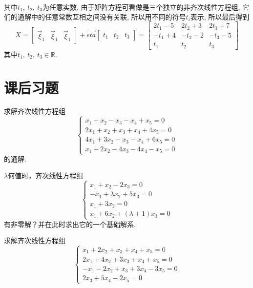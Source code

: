 \begin{eg}
其中$t_1,\ t_2,\ t_3$为任意实数, 由于矩阵方程可看做是三个独立的非齐次线性方程组, 它们的通解中的任意常数互相之间没有关联, 所以用不同的符号$t_i$表示, 所以最后得到
\begin{displaymath}
X=\begin{bmatrix}\vec{\xi}_1&\vec{\xi}_1&\vec{\xi}_1\end{bmatrix}+\vec{eta}\begin{bmatrix}
t_1&t_2&t_3\end{bmatrix}=\begin{bmatrix}2t_1-5&2t_2+3&2t_3+7\\-t_1+4&-t_2-2&-t_3-5\\t_1&t_2&t_3\end{bmatrix}
\end{displaymath}
其中$t_1,\ t_2,\ t_3\in\mathbb{R}$.
\end{eg}


\section{课后习题}

\begin{ex}\label{5.1}
求解齐次线性方程组\\
\begin{equation*}
\begin{cases}
x_1+x_2-x_3-x_4+x_5=0\\
2x_1+x_2+x_3+x_4+4x_5=0\\
4x_1+3x_2-x_3-x_4+6x_5=0\\
x_1+2x_2-4x_3-4x_4-x_5=0
\end{cases}
\end{equation*}
的通解.
\end{ex}

\begin{ex}\label{5.2}
$\lambda$何值时，齐次线性方程组
\begin{equation*}
\begin{cases}
x_1+x_2-2x_3=0\\
-x_1+\lambda x_2+5x_3=0\\
x_1+3x_2=0\\
x_1+6x_2+(\lambda+1) x_3=0
\end{cases}
\end{equation*}
有非零解？并在此时求出它的一个基础解系.
\end{ex}

\begin{ex}\label{5.3}
求解齐次线性方程组
\begin{equation*}
\begin{cases}
x_1+2x_2+ x_3+x_4+ x_5=0\\
2x_1+4x_2+3x_3+x_4+ x_5=0\\
-x_1-2x_2+ x_3+3x_4-3x_5=0\\
2x_3+5x_4-2x_5=0
\end{cases}
\end{equation*}
\end{ex}

